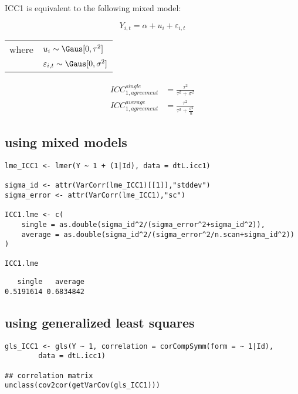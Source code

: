 \documentclass[12pt]{article}
\begin{document}
\bigskip

ICC1 is equivalent to the following mixed model:

\begin{equation}
 Y_{i,t} = \alpha + u_{i} + \varepsilon_{i,t} 
\end{equation}

\begin{tabular}{ll}
where & \(u_{i} \sim \Gaus[0,\tau^2] \)  \\
& \(\varepsilon_{i,t} \sim \Gaus[0,\sigma^2] \) \\
\end{tabular}

\begin{align}
 ICC^{single}_{1,agreement} &= \frac{\tau^2}{\tau^2 + \sigma^2} \\
 ICC^{average}_{1,agreement} &= \frac{\tau^2}{\tau^2 + \frac{\sigma^2}{n}}
\end{align}

\subsection{using mixed models}
\label{sec:org2225593}
\lstset{language=r,label= ,caption= ,captionpos=b,numbers=none}
\begin{lstlisting}
lme_ICC1 <- lmer(Y ~ 1 + (1|Id), data = dtL.icc1)

sigma_id <- attr(VarCorr(lme_ICC1)[[1]],"stddev")
sigma_error <- attr(VarCorr(lme_ICC1),"sc")

ICC1.lme <- c(
    single = as.double(sigma_id^2/(sigma_error^2+sigma_id^2)),
    average = as.double(sigma_id^2/(sigma_error^2/n.scan+sigma_id^2))
)

ICC1.lme
\end{lstlisting}

\begin{verbatim}
   single   average 
0.5191614 0.6834842
\end{verbatim}

\subsection{using generalized least squares}
\label{sec:orgce679be}
\lstset{language=r,label= ,caption= ,captionpos=b,numbers=none}
\begin{lstlisting}
gls_ICC1 <- gls(Y ~ 1, correlation = corCompSymm(form = ~ 1|Id), 
		data = dtL.icc1)

## correlation matrix
unclass(cov2cor(getVarCov(gls_ICC1)))
\end{lstlisting}
\end{document}
